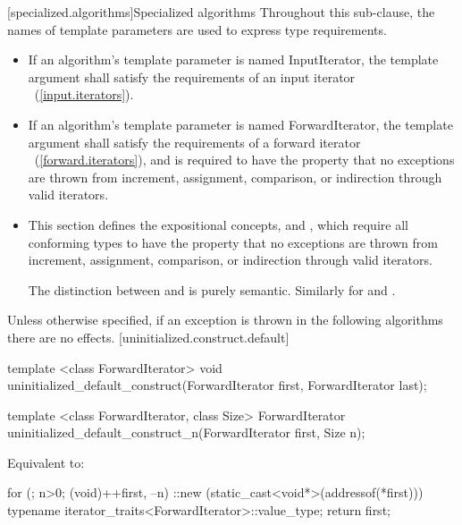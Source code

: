 \setcounter{subsection}{9}
[specialized.algorithms]{Specialized algorithms}
\setcounter{Paras}{0}
\pnum
Throughout this sub-clause, the names of template parameters are used to express type requirements.
{\color{remclr}
\begin{itemize}
\item If an algorithm's template parameter is named InputIterator, the template argument shall satisfy the
requirements of an input iterator ~(\ref{input.iterators}).

\item If an algorithm's template parameter is named ForwardIterator, the template argument shall satisfy the
requirements of a forward iterator ~(\ref{forward.iterators}), and is required to have the property that no exceptions
are thrown from increment, assignment, comparison, or indirection through valid iterators.
\end{itemize}
} %

{\color{addclr}
\setcounter{subparagraph}{0}
\begin{itemize}
\item This section defines the expositional concepts,  and ,
which require all conforming types to have the property that no exceptions are thrown from increment, assignment, comparison, or
indirection through valid iterators.

\enternote
The distinction between  and  is purely semantic. Similarly for
 and .
\exitnote
\end{itemize}
} %

Unless otherwise specified, if an exception is thrown in the following algorithms there are no effects.
[uninitialized.construct.default]{}
{\color{remclr}
\begin{codeblock}
template <class ForwardIterator>
  void uninitialized_default_construct(ForwardIterator first, ForwardIterator last);
\end{codeblock}

\begin{codeblock}
template <class ForwardIterator, class Size>
  ForwardIterator uninitialized_default_construct_n(ForwardIterator first, Size n);
\end{codeblock}

\setcounter{Paras}{1}
\pnum
\effects Equivalent to:
\begin{codeblock}
        for (; n>0; (void)++first, --n)
          ::new (static_cast<void*>(addressof(*first)))
            typename iterator_traits<ForwardIterator>::value_type;
        return first;
\end{codeblock}
} %

